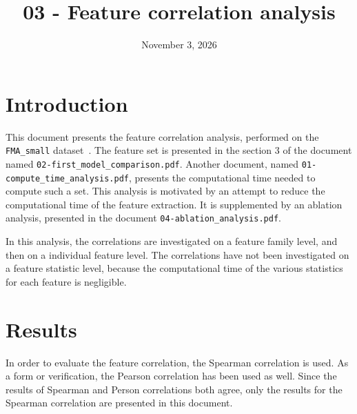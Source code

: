 \documentclass[11pt]{article}
\title{03 - Feature correlation analysis}
\author{}
\date{November 3, 2026}
\begin{document}
\maketitle

\section{Introduction}
This document presents the feature correlation analysis, performed on the
\texttt{FMA\_small} dataset~\cite{fma_dataset}. The feature set is presented in the section 3 of the document named \texttt{02-first\_model\_comparison.pdf}. Another document, named \texttt{01-compute\_time\_analysis.pdf}, presents the computational time needed to compute such a set.
This analysis is motivated by an attempt to reduce the computational time of the feature extraction. It is supplemented by an ablation analysis, presented in the document \texttt{04-ablation\_analysis.pdf}.

In this analysis, the correlations are investigated on a feature family level, and then on a individual feature level. The correlations have not been investigated on a feature statistic level, because the computational time of the various statistics for each feature is negligible.

\section{Results}
In order to evaluate the feature correlation, the Spearman correlation is used. As a form or verification, the Pearson correlation has been used as well. Since the results of Spearman and Person correlations both agree, only the results for the Spearman correlation are presented in this document.
\end{document}
